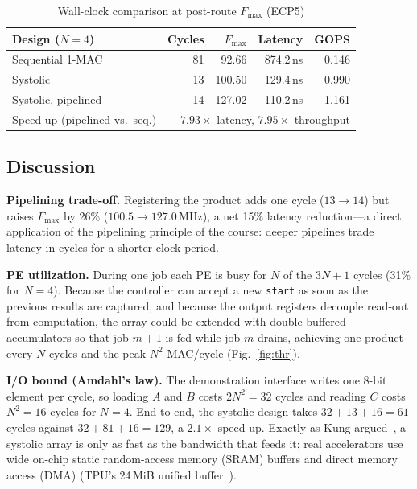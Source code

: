 \documentclass[conference]{IEEEtran}
\begin{document}
\begin{table}[t]
\centering
\caption{Wall-clock comparison at post-route $F_{\max}$ (ECP5)}
\label{tab:wall}
\setlength{\tabcolsep}{3pt}
\begin{tabular}{@{}lrrrr@{}}
\toprule
Design ($N=4$) & Cycles & $F_{\max}$ & Latency & GOPS\\
\midrule
Sequential 1-MAC     & 81 & 92.66  & 874.2\,ns & 0.146\\
Systolic             & 13 & 100.50 & 129.4\,ns & 0.990\\
Systolic, pipelined  & 14 & 127.02 & 110.2\,ns & 1.161\\
\midrule
Speed-up (pipelined vs.\ seq.) & \multicolumn{4}{r}{$7.93\times$ latency, $7.95\times$ throughput}\\
\bottomrule
\end{tabular}
\end{table}

\subsection{Discussion}\label{sec:disc}
\textbf{Pipelining trade-off.} Registering the product adds one cycle
($13\to14$) but raises $F_{\max}$ by 26\% ($100.5\to127.0$\,MHz), a net
15\% latency reduction---a direct application of the pipelining principle
of the course: deeper pipelines trade latency in cycles for a shorter clock
period.

\textbf{PE utilization.} During one job each PE is busy for $N$ of the
$3N+1$ cycles (31\% for $N=4$). Because the controller can accept a new
\texttt{start} as soon as the previous results are captured, and because
the output registers decouple read-out from computation, the array could be
extended with double-buffered accumulators so that job $m+1$ is fed while job
$m$ drains, achieving one product every $N$ cycles and the peak $N^2$
MAC/cycle (Fig.~\ref{fig:thr}).

\textbf{I/O bound (Amdahl's law).} The demonstration interface writes one
8-bit element per cycle, so loading $A$ and $B$ costs $2N^2=32$ cycles and
reading $C$ costs $N^2=16$ cycles for $N=4$. End-to-end, the systolic
design takes $32+13+16=61$ cycles against $32+81+16=129$, a $2.1\times$
speed-up. Exactly as Kung argued~\cite{kung1982why}, a systolic array is only
as fast as the bandwidth that feeds it; real accelerators use wide on-chip
static random-access memory (SRAM) buffers and direct memory access (DMA) (TPU's 24\,MiB unified buffer~\cite{jouppi2017tpu}).
\end{document}
